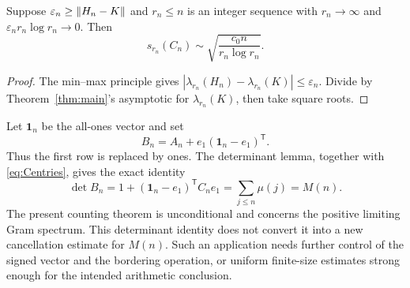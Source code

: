 \begin{corollary}\label{cor:growing}
Suppose $\varepsilon_n\ge\left\lVert H_n-K\right\rVert$ and $r_n\le n$ is an integer
sequence with $r_n\to\infty$ and
$\varepsilon_n r_n\log r_n\to0$. Then
\[
 s_{r_n}(C_n)\sim
       \sqrt{\frac{c_0 n}{r_n\log r_n}}.
\]
\end{corollary}
\begin{proof}
The min--max principle gives
$|\lambda_{r_n}(H_n)-\lambda_{r_n}(K)|\le\varepsilon_n$.
Divide by Theorem~\ref{thm:main}'s asymptotic for $\lambda_{r_n}(K)$,
then take square roots.
\end{proof}

\begin{remark}
Let $\mathbf 1_n$ be the all-ones vector and set
\[
 B_n=A_n+e_1(\mathbf 1_n-e_1)^{\mathsf T}.
\]
Thus the first row is replaced by ones. The determinant lemma, together
with \eqref{eq:Centries}, gives the exact identity
\[
 \det B_n
 =1+(\mathbf 1_n-e_1)^{\mathsf T}C_ne_1
 =\sum_{j\le n}\mu(j)=M(n).
\]
The present counting theorem is unconditional and concerns the positive
limiting Gram spectrum. This determinant identity does not convert it into
a new cancellation estimate for $M(n)$. Such an application needs further
control of the signed vector and the bordering operation, or uniform
finite-size estimates strong enough for the intended arithmetic conclusion.
\end{remark}
